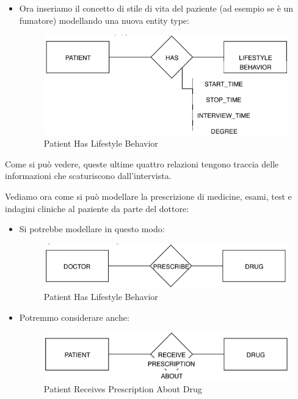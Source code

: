 \begin{itemize}
\item Ora inseriamo il concetto di stile di vita del paziente (ad esempio se è un fumatore) modellando una nuova entity type: 

\begin{center}
\begin{figure}[H]
\centering
\includegraphics[scale=1]{figures/patient_has_lb.png}
\caption{Patient Has Lifestyle Behavior}
\end{figure}
\end{center}

\end{itemize}

Come si può vedere, queste ultime quattro relazioni tengono traccia delle informazioni che scaturiscono dall’intervista.	

Vediamo ora come si può modellare la prescrizione di medicine, esami, test e indagini cliniche al paziente da parte del dottore:

\begin{itemize}

\item Si potrebbe modellare in questo modo:

\begin{center}
\begin{figure}[H]
\centering
\includegraphics[scale=1]{figures/doctor_prescribe_drug.png}
\caption{Patient Has Lifestyle Behavior}
\end{figure}
\end{center}

\item Potremmo considerare anche: 

\begin{center}
\begin{figure}[H]
\centering
\includegraphics[scale=1]{figures/patient_rpa_drug.png}
\caption{Patient Receives Prescription About Drug}
\end{figure}
\end{center}

\end{itemize}

